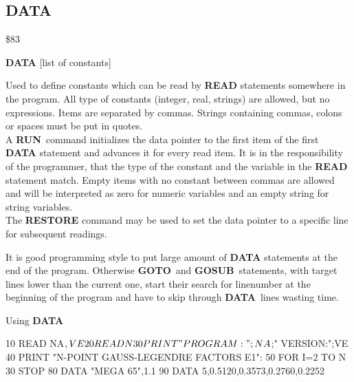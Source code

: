 \subsection{DATA}
\begin{description}[leftmargin=3cm,style=nextline]
\item [Token:] \$83
\item [Format:] {\bf DATA} [list of constants]
\item [Usage:] Used to define constants
               which can be read by {\bf READ} statements somewhere
               in the program. All type of constants (integer, real,
               strings) are allowed, but no expressions.
               Items are separated by commas.
               Strings containing commas, colons or spaces must be put
               in quotes. \\
               A {\bf RUN} command initializes the data pointer
               to the first item of the first {\bf DATA} statement
               and advances it for every read item. It is in the
               responsibility of the programmer, that the type of
               the constant and the variable in the {\bf READ}
               statement match. Empty items with no constant
               between commas are allowed and will be interpreted as
               zero for numeric variables and an empty string for
               string variables. \\
               The {\bf RESTORE} command may be used to set the
               data pointer to a specific line for subsequent
               readings.

\item [Remarks:] It is good programming style to put large amount of
               {\bf DATA} statements at the end of the program.
               Otherwise {\bf GOTO} and {\bf GOSUB} statements, with
               target lines lower than the current one,
               start their search for linenumber at the beginning of
               the program and have to skip through {\bf DATA} lines
               wasting time.
\item [Example:] Using {\bf DATA}
\begin{screenoutput}
10 READ NA$, VE
20 READ N%
30 PRINT "PROGRAM:";NA$;"   VERSION:";VE
40 PRINT "N-POINT GAUSS-LEGENDRE FACTORS E1":
50 FOR I=2 TO N%
30 STOP
80 DATA "MEGA 65",1.1
90 DATA 5,0.5120,0.3573,0.2760,0.2252
\end{screenoutput}
\end{description}

